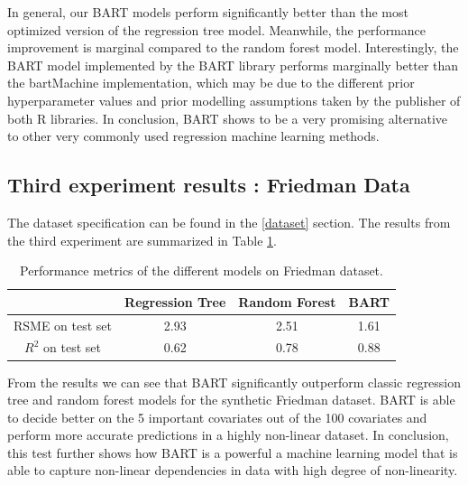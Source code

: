 \documentclass{usiinftr}
\begin{document}
In general, our BART models perform significantly better than the most optimized version of the regression tree model. Meanwhile, the performance improvement is marginal compared to the random forest model. Interestingly, the BART model implemented by the BART library performs marginally better than the bartMachine implementation, which may be due to the different prior hyperparameter values and prior modelling assumptions taken by the publisher of both R libraries. In conclusion, BART shows to be a very promising alternative to other very commonly used regression machine learning methods.

\subsection{Third experiment results : Friedman Data}
The dataset specification can be found in the \ref{dataset} section. The results from the third experiment are summarized in Table \ref{result}.

\begin{table} \label{result}
\centering \caption{Performance metrics of the different models on Friedman dataset.}
\begin{tabular}{|c|c|c|c|} 
\hline & Regression Tree & Random Forest & BART \\
\hline RSME on test set & 2.93 & 2.51 & 1.61 \\
\hline $R^2$ on test set & 0.62 & 0.78 & 0.88 \\
\hline
\end{tabular}
\end{table}

From the results we can see that BART significantly outperform classic regression tree and random forest models for the synthetic Friedman dataset. BART is able to decide better on the 5 important covariates out of the 100 covariates and perform more accurate predictions in a highly non-linear dataset. In conclusion, this test further shows how BART is a powerful a machine learning model that is able to capture non-linear dependencies in data with high degree of non-linearity. 
\end{document}
